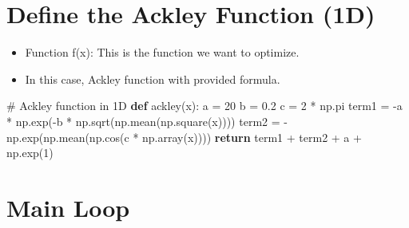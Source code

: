 \documentclass[
  letterpaper,
  DIV=11,
  numbers=noendperiod]{scrreprt}
\newenvironment{Shaded}{\begin{snugshade}}{\end{snugshade}}
\newcommand{\CommentTok}[1]{\textcolor[rgb]{0.37,0.37,0.37}{#1}}
\newcommand{\ControlFlowTok}[1]{\textcolor[rgb]{0.00,0.23,0.31}{\textbf{#1}}}
\newcommand{\DecValTok}[1]{\textcolor[rgb]{0.68,0.00,0.00}{#1}}
\newcommand{\FloatTok}[1]{\textcolor[rgb]{0.68,0.00,0.00}{#1}}
\newcommand{\KeywordTok}[1]{\textcolor[rgb]{0.00,0.23,0.31}{\textbf{#1}}}
\newcommand{\NormalTok}[1]{\textcolor[rgb]{0.00,0.23,0.31}{#1}}
\newcommand{\OperatorTok}[1]{\textcolor[rgb]{0.37,0.37,0.37}{#1}}
\providecommand{\tightlist}{%
  \setlength{\itemsep}{0pt}\setlength{\parskip}{0pt}}\usepackage{longtable,booktabs,array}
\begin{document}
\section{Define the Ackley Function
(1D)}\label{define-the-ackley-function-1d}

\begin{itemize}
\tightlist
\item
  Function f(x): This is the function we want to optimize.
\item
  In this case, Ackley function with provided formula.
\end{itemize}

\begin{Shaded}
\begin{Highlighting}[]
\CommentTok{\# Ackley function in 1D}
\KeywordTok{def}\NormalTok{ ackley(x):}
\NormalTok{    a }\OperatorTok{=} \DecValTok{20}
\NormalTok{    b }\OperatorTok{=} \FloatTok{0.2}
\NormalTok{    c }\OperatorTok{=} \DecValTok{2} \OperatorTok{*}\NormalTok{ np.pi}
\NormalTok{    term1 }\OperatorTok{=} \OperatorTok{{-}}\NormalTok{a }\OperatorTok{*}\NormalTok{ np.exp(}\OperatorTok{{-}}\NormalTok{b }\OperatorTok{*}\NormalTok{ np.sqrt(np.mean(np.square(x))))}
\NormalTok{    term2 }\OperatorTok{=} \OperatorTok{{-}}\NormalTok{np.exp(np.mean(np.cos(c }\OperatorTok{*}\NormalTok{ np.array(x))))}
    \ControlFlowTok{return}\NormalTok{ term1 }\OperatorTok{+}\NormalTok{ term2 }\OperatorTok{+}\NormalTok{ a }\OperatorTok{+}\NormalTok{ np.exp(}\DecValTok{1}\NormalTok{)}
\end{Highlighting}
\end{Shaded}

\section{Main Loop}\label{main-loop-1}
\end{document}
